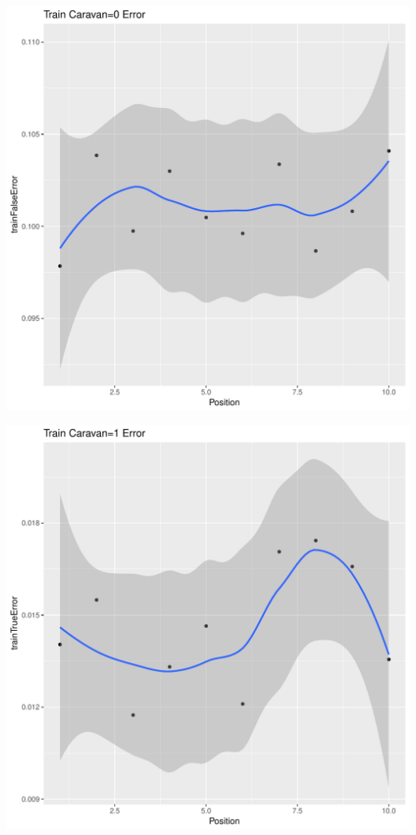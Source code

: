 \documentclass{article}\usepackage[]{graphicx}\usepackage[]{color}
\makeatletter
\def\maxwidth{ %
  \ifdim\Gin@nat@width>\linewidth
    \linewidth
  \else
    \Gin@nat@width
  \fi
}
\newenvironment{kframe}{%
 \def\at@end@of@kframe{}%
 \ifinner\ifhmode%
  \def\at@end@of@kframe{\end{minipage}}%
  \begin{minipage}{\columnwidth}%
 \fi\fi%
 \def\FrameCommand##1{\hskip\@totalleftmargin \hskip-\fboxsep
 \colorbox{shadecolor}{##1}\hskip-\fboxsep
     \hskip-\linewidth \hskip-\@totalleftmargin \hskip\columnwidth}%
 \MakeFramed {\advance\hsize-\width
   \@totalleftmargin\z@ \linewidth\hsize
   \@setminipage}}%
 {\par\unskip\endMakeFramed%
 \at@end@of@kframe}
\newenvironment{knitrout}{}{} %
\makeatother
\begin{document}
\begin{knitrout}
\begin{kframe}
{\ttfamily\noindent\itshape\color{messagecolor}{\#\# `geom\_smooth()` using method = 'loess'}}\end{kframe}
\includegraphics[width=\maxwidth]{figure/unnamed-chunk-43-2} 
\begin{kframe}

{\ttfamily\noindent\itshape\color{messagecolor}{\#\# `geom\_smooth()` using method = 'loess'}}\end{kframe}
\includegraphics[width=\maxwidth]{figure/unnamed-chunk-43-3} 
\begin{kframe}


\end{kframe}
\end{knitrout}
\end{document}
